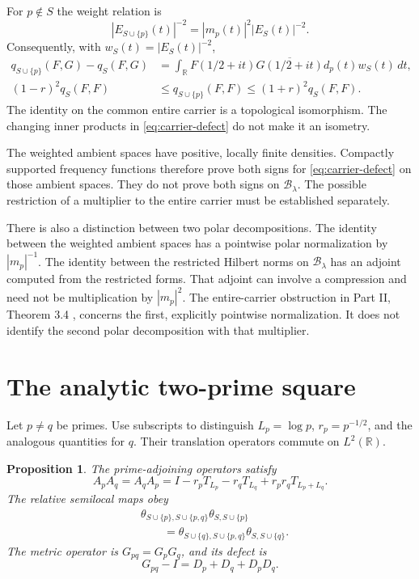 \documentclass[11pt,letterpaper]{article}
\newtheorem{proposition}[theorem]{Proposition}
\theoremstyle{definition}
\theoremstyle{remark}
\newcommand{\R}{\mathbb R}
\newcommand{\Bcal}{\mathcal B}
\begin{document}
For $p\notin S$ the weight relation is
\begin{equation}\label{eq:weight-relation}
 |E_{S\cup\{p\}}(t)|^{-2}=|m_p(t)|^2|E_S(t)|^{-2}.
\end{equation}
Consequently, with $w_S(t)=|E_S(t)|^{-2}$,
\begin{align}
 q_{S\cup\{p\}}(F,G)-q_S(F,G)
 &=\int_\R F(1/2+it)\overline{G(1/2+it)}d_p(t)w_S(t)\,dt,
 \label{eq:carrier-defect}\\
 (1-r)^2q_S(F,F)&\le q_{S\cup\{p\}}(F,F)
                  \le(1+r)^2q_S(F,F).
 \label{eq:carrier-comparison}
\end{align}
The identity on the common entire carrier is a topological
isomorphism. The changing inner products in
\eqref{eq:carrier-defect} do not make it an isometry.

The weighted ambient spaces have positive, locally finite densities.
Compactly supported frequency functions therefore prove both signs
for \eqref{eq:carrier-defect} on those ambient spaces. They do not
prove both signs on $\Bcal_\lambda$. The possible restriction of a
multiplier to the entire carrier must be established separately.

There is also a distinction between two polar decompositions. The
identity between the weighted ambient spaces has a pointwise polar
normalization by $|m_p|^{-1}$. The identity between the restricted
Hilbert norms on $\Bcal_\lambda$ has an adjoint computed from the
restricted forms. That adjoint can involve a compression and need not
be multiplication by $|m_p|^2$. The entire-carrier obstruction in
Part II, Theorem 3.4 \cite{PartII}, concerns the first, explicitly pointwise
normalization. It does not identify the second polar decomposition
with that multiplier.

\section{The analytic two-prime square}

Let $p\ne q$ be primes. Use subscripts to distinguish
$L_p=\log p$, $r_p=p^{-1/2}$, and the analogous quantities for $q$.
Their translation operators commute on $L^2(\R)$.

\begin{proposition}\label{prop:local-correspondence:square}
The prime-adjoining operators satisfy
\begin{equation}\label{eq:two-prime-A}
 A_pA_q=A_qA_p
 =I-r_pT_{L_p}-r_qT_{L_q}+r_pr_qT_{L_p+L_q}.
\end{equation}
The relative semilocal maps obey
\begin{equation}\label{eq:two-prime-theta}
 \begin{aligned}
 &\theta_{S\cup\{p\},S\cup\{p,q\}}\theta_{S,S\cup\{p\}}\\
 &\qquad=\theta_{S\cup\{q\},S\cup\{p,q\}}\theta_{S,S\cup\{q\}}.
 \end{aligned}
\end{equation}
The metric operator is $G_{pq}=G_pG_q$, and its defect is
\begin{equation}\label{eq:two-prime-defect}
 G_{pq}-I=D_p+D_q+D_pD_q.
\end{equation}
\end{proposition}
\end{document}
